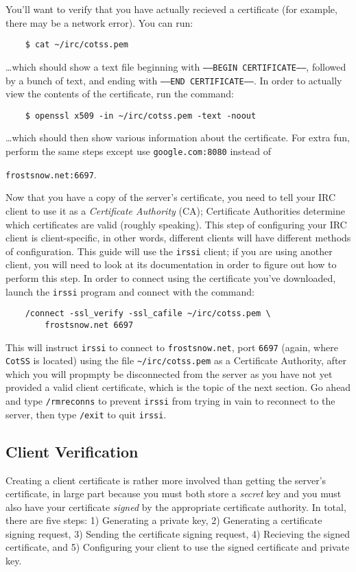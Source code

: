 \documentclass{article}
\begin{document}
You'll want to verify that you have actually recieved a certificate (for example, there may be a network error).  You can run:
\begin{lstlisting}
	$ cat ~/irc/cotss.pem
\end{lstlisting}
\ldots which should show a text file beginning with \texttt{-----BEGIN CERTIFICATE-----}, followed by a bunch of text, and ending with \texttt{-----END CERTIFICATE-----}.  In order to actually view the contents of the certificate, run the command:
\begin{lstlisting}
	$ openssl x509 -in ~/irc/cotss.pem -text -noout
\end{lstlisting}
\ldots which should then show various information about the certificate.  For extra fun, perform the same steps except use \texttt{google.com:8080} instead of {\texttt{frostsnow.net:6697}.

Now that you have a copy of the server's certificate, you need to tell your IRC client to use it as a \textit{Certificate Authority} (CA); Certificate Authorities determine which certificates are valid (roughly speaking).  This step of configuring your IRC client is client-specific, in other words, different clients will have different methods of configuration.  This guide will use the \texttt{irssi} client; if you are using another client, you will need to look at its documentation in order to figure out how to perform this step.  In order to connect using the certificate you've downloaded, launch the \texttt{irssi} program and connect with the command:
\begin{lstlisting}
    /connect -ssl_verify -ssl_cafile ~/irc/cotss.pem \
        frostsnow.net 6697
\end{lstlisting}
This will instruct \texttt{irssi} to connect to \texttt{frostsnow.net}, port \texttt{6697} (again, where \texttt{CotSS} is located) using the file \texttt{\textasciitilde/irc/cotss.pem} as a Certificate Authority, after which you will propmpty be disconnected from the server as you have not yet provided a valid client certificate, which is the topic of the next section.  Go ahead and type \texttt{/rmreconns} to prevent \texttt{irssi} from trying in vain to reconnect to the server, then type \texttt{/exit} to quit \texttt{irssi}.

\subsection{Client Verification}
Creating a client certificate is rather more involved than getting the server's certificate, in large part because you must both store a \textit{secret} key and you must also have your certificate \textit{signed} by the appropriate certificate authority.  In total, there are five steps: 1) Generating a private key, 2) Generating a certificate signing request, 3) Sending the certificate signing request, 4) Recieving the signed certificate, and 5) Configuring your client to use the signed certificate and private key.

}
\end{document}
